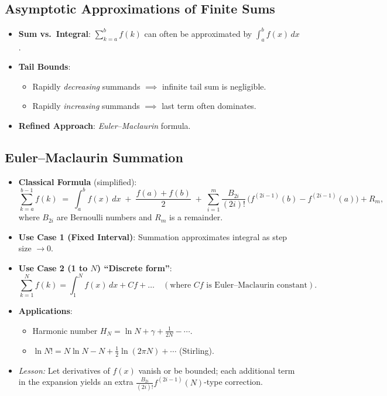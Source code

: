 \documentclass[11pt,letterpaper]{article}
\begin{document}
\subsection{Asymptotic Approximations of Finite Sums}
\begin{itemize}
  \item \textbf{Sum vs.\ Integral}: $\sum_{k=a}^{b}f(k)$ can often be approximated by $\int_{a}^{b}f(x)\,dx$.
  \item \textbf{Tail Bounds}:
    \begin{itemize}
      \item Rapidly \emph{decreasing} summands $\implies$ infinite tail sum is negligible.
      \item Rapidly \emph{increasing} summands $\implies$ last term often dominates.
    \end{itemize}
  \item \textbf{Refined Approach}: \emph{Euler--Maclaurin} formula.
\end{itemize}

\subsection{Euler--Maclaurin Summation}
\begin{itemize}
  \item \textbf{Classical Formula} (simplified):
    \[
      \sum_{k=a}^{b-1} f(k)
      \;=\;\int_{a}^{b} f(x)\,dx \;+\;\frac{f(a)+f(b)}{2}
      \;+\;\sum_{i=1}^{m} \frac{B_{2i}}{(2i)!}\,\bigl(f^{(2i-1)}(b)-f^{(2i-1)}(a)\bigr)+R_m,
    \]
    where $B_{2i}$ are Bernoulli numbers and $R_m$ is a remainder.
  \item \textbf{Use Case 1 (Fixed Interval)}: Summation approximates integral as step size $\to 0$.
  \item \textbf{Use Case 2 (1 to $N$) “Discrete form”}:
    \[
      \sum_{k=1}^{N} f(k)=\int_{1}^{N}f(x)\,dx + Cf + \dots
      \quad(\text{where $Cf$ is Euler--Maclaurin constant}).
    \]
  \item \textbf{Applications}:
    \begin{itemize}
      \item Harmonic number $H_N = \ln N + \gamma + \frac{1}{2N}-\cdots$.
      \item $\ln N! = N\ln N - N + \frac12\ln(2\pi N)+\cdots$ (Stirling).
    \end{itemize}
  \item \emph{Lesson:} Let derivatives of $f(x)$ vanish or be bounded; each additional term in the expansion yields an extra $\frac{B_{2i}}{(2i)!}f^{(2i-1)}(N)$-type correction.
\end{itemize}
\end{document}
